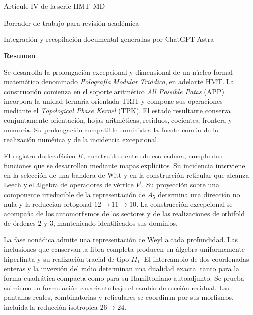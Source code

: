 \begin{center}
{\fontsize{18}{22}\selectfont\bfseries\Titulo\par}
\vspace{10mm}
{\large\Autores\par}
\vspace{5mm}
{\small Artículo IV de la serie HMT--MD\par}
\vspace{2mm}
{\small Borrador de trabajo para revisión académica\par}
{\footnotesize Integración y recopilación documental generadas por ChatGPT Astra\par}
\end{center}
\vspace{6mm}
\begin{center}\textbf{Resumen}\end{center}
Se desarrolla la prolongación excepcional y dimensional de un núcleo formal
matemático denominado \emph{Holografía Modular Triádica}, en adelante HMT.
La construcción comienza en el soporte aritmético \emph{All Possible Paths}
(APP), incorpora la unidad ternaria orientada TRIT y compone sus operaciones
mediante el \emph{Topological Phase Kernel} (TPK). El estado resultante
conserva conjuntamente orientación, hojas aritméticas, residuos, cocientes,
frontera y memoria. Su prolongación compatible suministra la fuente común
de la realización numérica y de la incidencia excepcional.

El registro dodecafásico \(K\), construido dentro de esa cadena, cumple dos
funciones que se desarrollan mediante mapas explícitos. Su incidencia
interviene en la selección de una bandera de Witt y en la construcción
reticular que alcanza Leech y el álgebra de operadores de vértice
\(V^\natural\). Su proyección sobre una componente irreducible de la
representación de \(A_5\) determina una dirección no nula y la reducción
ortogonal \(12\to11\to10\). La construcción excepcional se acompaña de
los automorfismos de los sectores y de las realizaciones de orbifold de
órdenes \(2\) y \(3\), manteniendo identificados sus dominios.

La fase nonádica admite una representación de Weyl a cada profundidad.
Las inclusiones que conservan la fibra completa producen un álgebra
uniformemente hiperfinita y su realización tracial de tipo \(II_1\).
El intercambio de dos coordenadas enteras y la inversión del radio
determinan una dualidad exacta, tanto para la forma cuadrática compacta
como para su Hamiltoniano autoadjunto. Se prueba asimismo su formulación
covariante bajo el cambio de sección residual. Las pantallas reales,
combinatorias y reticulares se coordinan por sus morfismos, incluida la
reducción isotrópica \(26\to24\).

